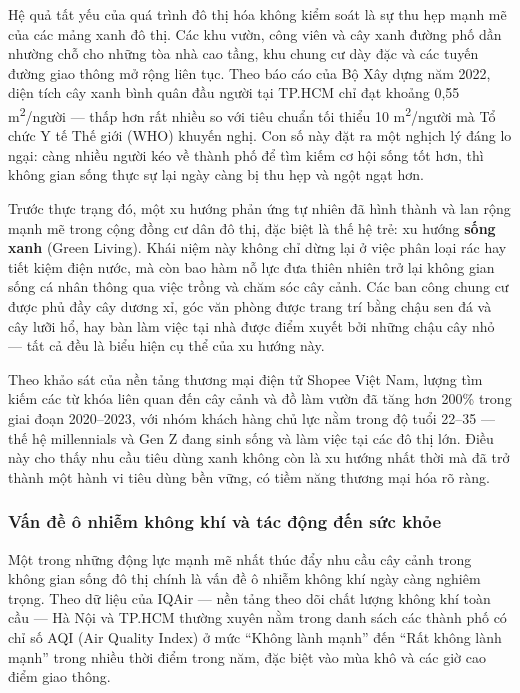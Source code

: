 \documentclass[11pt, a4paper]{article}
\begin{document}
Hệ quả tất yếu của quá trình đô thị hóa không kiểm soát là sự thu hẹp mạnh mẽ của các mảng xanh đô thị. Các khu vườn, công viên và cây xanh đường phố dần nhường chỗ cho những tòa nhà cao tầng, khu chung cư dày đặc và các tuyến đường giao thông mở rộng liên tục. Theo báo cáo của Bộ Xây dựng năm 2022, diện tích cây xanh bình quân đầu người tại TP.HCM chỉ đạt khoảng 0,55 m\textsuperscript{2}/người --- thấp hơn rất nhiều so với tiêu chuẩn tối thiểu 10 m\textsuperscript{2}/người mà Tổ chức Y tế Thế giới (WHO) khuyến nghị. Con số này đặt ra một nghịch lý đáng lo ngại: càng nhiều người kéo về thành phố để tìm kiếm cơ hội sống tốt hơn, thì không gian sống thực sự lại ngày càng bị thu hẹp và ngột ngạt hơn.

Trước thực trạng đó, một xu hướng phản ứng tự nhiên đã hình thành và lan rộng mạnh mẽ trong cộng đồng cư dân đô thị, đặc biệt là thế hệ trẻ: xu hướng \textbf{sống xanh} (Green Living). Khái niệm này không chỉ dừng lại ở việc phân loại rác hay tiết kiệm điện nước, mà còn bao hàm nỗ lực đưa thiên nhiên trở lại không gian sống cá nhân thông qua việc trồng và chăm sóc cây cảnh. Các ban công chung cư được phủ đầy cây dương xỉ, góc văn phòng được trang trí bằng chậu sen đá và cây lưỡi hổ, hay bàn làm việc tại nhà được điểm xuyết bởi những chậu cây nhỏ --- tất cả đều là biểu hiện cụ thể của xu hướng này.

Theo khảo sát của nền tảng thương mại điện tử Shopee Việt Nam, lượng tìm kiếm các từ khóa liên quan đến cây cảnh và đồ làm vườn đã tăng hơn 200\% trong giai đoạn 2020--2023, với nhóm khách hàng chủ lực nằm trong độ tuổi 22--35 --- thế hệ millennials và Gen Z đang sinh sống và làm việc tại các đô thị lớn. Điều này cho thấy nhu cầu tiêu dùng xanh không còn là xu hướng nhất thời mà đã trở thành một hành vi tiêu dùng bền vững, có tiềm năng thương mại hóa rõ ràng.

\subsubsection{Vấn đề ô nhiễm không khí và tác động đến sức khỏe}

Một trong những động lực mạnh mẽ nhất thúc đẩy nhu cầu cây cảnh trong không gian sống đô thị chính là vấn đề ô nhiễm không khí ngày càng nghiêm trọng. Theo dữ liệu của IQAir --- nền tảng theo dõi chất lượng không khí toàn cầu --- Hà Nội và TP.HCM thường xuyên nằm trong danh sách các thành phố có chỉ số AQI (Air Quality Index) ở mức ``Không lành mạnh'' đến ``Rất không lành mạnh'' trong nhiều thời điểm trong năm, đặc biệt vào mùa khô và các giờ cao điểm giao thông.
\end{document}
